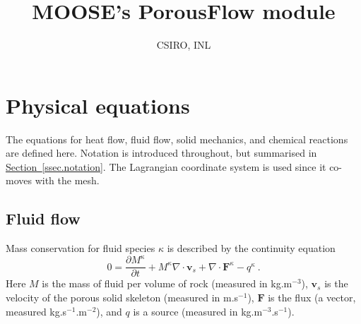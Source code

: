\documentclass[12pt]{report}
\def\species{\kappa}
\def\flux{\mathbf{F}}
\begin{document}
\title{MOOSE's PorousFlow module}


\author{CSIRO, INL}

\maketitle


\tableofcontents


\chapter{Physical equations}
\label{sec.physical.equations}

The equations for heat flow, fluid flow, solid mechanics, and chemical
reactions are defined here.  Notation is introduced throughout, but
summarised in \hyperref[ssec.notation]{Section~\ref*{ssec.notation}}.  The Lagrangian coordinate
system is used since it co-moves with the mesh.

\section{Fluid flow}

Mass conservation for fluid species $\species$ is described by the continuity
equation
\begin{equation}
0 = \frac{\partial M^{\species}}{\partial t} + M^{\species}\nabla\cdot{\mathbf
  v}_{s} + \nabla\cdot \flux^{\species} - q^{\species} \ .
\label{mass.cons.sp.eqn}
\end{equation}
Here $M$ is the mass of fluid per volume of rock (measured in
kg.m$^{-3}$), ${\mathbf v}_{s}$ is the velocity of the porous solid skeleton
(measured in m.s$^{-1}$), $\flux$ is the flux (a vector, measured
kg.s$^{-1}$.m$^{-2}$), and $q$ is a source (measured in
kg.m$^{-3}$.s$^{-1}$).
\end{document}
